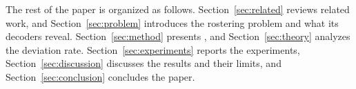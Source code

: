 The rest of the paper is organized as follows.
Section~\ref{sec:related} reviews related work, and Section~\ref{sec:problem} introduces the rostering problem and what its decoders reveal.
Section~\ref{sec:method} presents \RDD, and Section~\ref{sec:theory} analyzes the deviation rate.
Section~\ref{sec:experiments} reports the experiments, Section~\ref{sec:discussion} discusses the results and their limits, and Section~\ref{sec:conclusion} concludes the paper.
